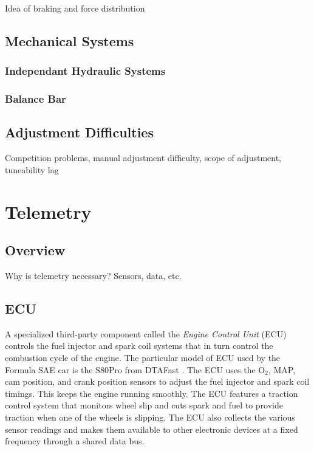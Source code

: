 Idea of braking and force distribution


\subsection{Mechanical Systems}


\subsubsection{Independant Hydraulic Systems}


\subsubsection{Balance Bar}


\subsection{Adjustment Difficulties}

Competition problems, manual adjustment difficulty, scope of adjustment,
tuneability lag


\section{Telemetry}


\subsection{Overview}

Why is telemetry necessary? Sensors, data, etc.


\subsection{ECU}

A specialized third-party component called the \emph{Engine Control Unit} (ECU) controls the fuel injector and spark coil systems that in turn control the combustion cycle of the engine. The particular model of ECU used by the Formula SAE car is the S80Pro from DTAFast \cite{s80pro}. The ECU uses the O$_{2}$, MAP, cam position, and crank position sensors to adjust the fuel injector and spark coil timings. This keeps the engine running smoothly. The ECU features a traction control system that monitors wheel slip and cuts spark and fuel to provide traction when one of the wheels is slipping. The ECU also collects the various sensor readings and makes them available to other electronic devices at a fixed frequency through a shared data bus. 

